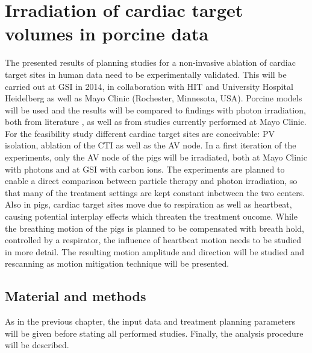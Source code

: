 
\chapter{Irradiation of cardiac target volumes in porcine data}
\label{chapter:porcine}
\minitoc

The presented results of planning studies for a non-invasive ablation of cardiac target sites in human data need to be experimentally 
validated. This will be carried out at GSI in 2014, in collaboration with HIT and University Hospital Heidelberg as well as Mayo Clinic 
(Rochester, Minnesota, USA). Porcine models will be used and the results will be compared to findings with photon irradiation, both from 
literature \cite{Sha10, Bla13}, as well as from studies currently performed at Mayo Clinic. For the feasibility study different cardiac 
target sites are conceivable: PV isolation, ablation of the CTI as well as the AV node. In a first iteration of the experiments, only the AV 
node of the pigs will be irradiated, both at Mayo Clinic with photons and at GSI with carbon ions. The experiments are planned to enable a 
direct comparison between particle therapy and photon irradiation, so that many of the treatment settings are kept constant inbetween the two 
centers. Also in pigs, cardiac target sites move due to respiration as well as heartbeat, causing potential interplay effects 
which threaten the treatment oucome. While the breathing motion of the pigs is planned to be compensated with breath hold, controlled 
by a respirator, the influence of heartbeat motion needs to be studied in more detail. The resulting motion amplitude and direction will be 
studied and rescanning as motion mitigation technique will be presented.

\section{Material and methods}
As in the previous chapter, the input data and treatment planning parameters will be given before stating all performed studies. 
Finally, the analysis procedure will be described.  

